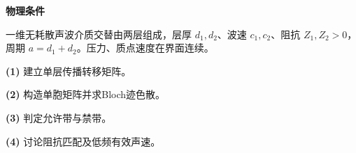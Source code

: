 \textbf{物理条件}\par 一维无耗散声波介质交替由两层组成，层厚 \(d_1,d_2\)、波速 \(c_1,c_2\)、阻抗 \(Z_1,Z_2>0\)，周期 \(a=d_1+d_2\)。压力、质点速度在界面连续。
\par\noindent\textbf{(1)} 建立单层传播转移矩阵。
\par\noindent\textbf{(2)} 构造单胞矩阵并求Bloch迹色散。
\par\noindent\textbf{(3)} 判定允许带与禁带。
\par\noindent\textbf{(4)} 讨论阻抗匹配及低频有效声速。
